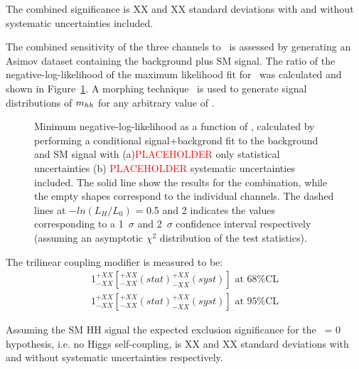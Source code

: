 The combined significance is XX and XX standard deviations with and without systematic uncertainties included.

The combined sensitivity of the three channels to \kl\ is assessed by generating an Asimov dataset containing the background plus SM signal. The ratio of the negative-log-likelihood of the maximum likelihood fit for \kl\ was calculated and shown in Figure~\ref{fig:ATLAS_HH_comb}. A morphing technique~\cite{ATL-PHYS-PUB-2015-047} is used to generate signal distributions of $m_{hh}$ for any arbitrary value of \kl.

\begin{figure}[!htb]
\centering 
{} 
\caption{Minimum negative-log-likelihood as a function of \kl, calculated by performing a conditional signal+backgrond fit to the background and SM signal with (a)\textcolor{red}{PLACEHOLDER} only statistical uncertainties (b) \textcolor{red}{PLACEHOLDER} systematic uncertainties included. The solid line show the results for the combination, while the empty shapes correspond to the individual channels. The dashed lines at $-ln(L_{H}/L_{0})$ = 0.5 and 2 indicates the values corresponding to a 1~$\sigma$ and 2~$\sigma$ confidence interval respectively (assuming an asymptotic $\chi^{2}$ distribution of the test statistics).} 
\label{fig:ATLAS_HH_comb} 
\end{figure}

The trilinear coupling modifier is measured to be:
\[
\begin{split}
1^{+XX}_{-XX} [^{+XX}_{-XX} (stat) ^{+XX}_{-XX} (syst)] \text{ at 68\% CL} \\
1^{+XX}_{-XX} [^{+XX}_{-XX} (stat) ^{+XX}_{-XX} (syst)] \text{ at 95\% CL}
\end{split}
\]

Assuming the SM HH signal the expected exclusion significance for the \kl\ = 0 hypothesis, i.e. no Higgs self-coupling, is XX and XX standard deviations with and without systematic uncertainties respectively.








